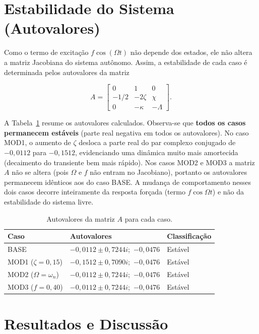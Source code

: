 \documentclass[a4paper,11pt]{article}
\begin{document}
\section{Estabilidade do Sistema (Autovalores)}

Como o termo de excitação $f\cos(\Omega t)$ não depende dos estados, ele
não altera a matriz Jacobiana do sistema autônomo. Assim, a estabilidade
de cada caso é determinada pelos autovalores da matriz

\[
A=\begin{bmatrix} 0 & 1 & 0 \\ -1/2 & -2\zeta & \chi \\ 0 & -\kappa & -\Lambda\end{bmatrix}.
\]

A Tabela~\ref{tab:autovalores} resume os autovalores calculados.
Observa-se que \textbf{todos os casos permanecem estáveis}
(parte real negativa em todos os autovalores). No caso MOD1, o aumento de
$\zeta$ desloca a parte real do par complexo conjugado de $-0{,}0112$ para
$-0{,}1512$, evidenciando uma dinâmica muito mais amortecida
(decaimento do transiente bem mais rápido). Nos casos MOD2 e MOD3 a matriz
$A$ não se altera (pois $\Omega$ e $f$ não entram no Jacobiano), portanto os
autovalores permanecem idênticos aos do caso BASE. A mudança de
comportamento nesses dois casos decorre inteiramente da resposta forçada
(termo $f\cos\Omega t$) e não da estabilidade do sistema livre.

\begin{table}[h]
\centering
\caption{Autovalores da matriz $A$ para cada caso.}
\label{tab:autovalores}
\begin{tabular}{lll}
\toprule
\textbf{Caso} & \textbf{Autovalores} & \textbf{Classificação} \\
\midrule
BASE & $-0{,}0112 \pm 0{,}7244i$;\ $-0{,}0476$ & Estável \\
MOD1 ($\zeta=0{,}15$) & $-0{,}1512 \pm 0{,}7090i$;\ $-0{,}0476$ & Estável \\
MOD2 ($\Omega=\omega_n$) & $-0{,}0112 \pm 0{,}7244i$;\ $-0{,}0476$ & Estável \\
MOD3 ($f=0{,}40$) & $-0{,}0112 \pm 0{,}7244i$;\ $-0{,}0476$ & Estável \\
\bottomrule
\end{tabular}
\end{table}

\section{Resultados e Discussão}
\end{document}
